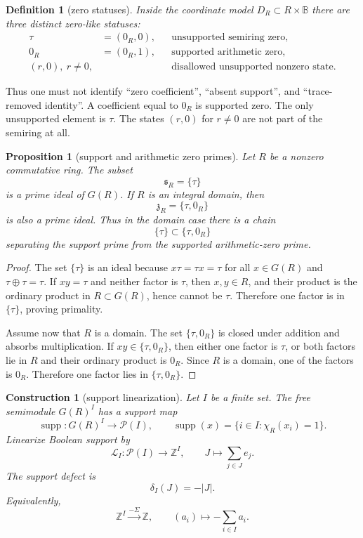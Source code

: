 \documentclass[11pt]{article}
\newtheorem{proposition}[theorem]{Proposition}
\newtheorem{definition}[theorem]{Definition}
\newtheorem{construction}[theorem]{Construction}
\theoremstyle{remark}
\DeclareMathOperator{\supp}{supp}
\newcommand{\ZZ}{\mathbb Z}
\newcommand{\BB}{\mathbb B}
\begin{document}
\begin{definition}[zero statuses]
Inside the coordinate model $D_R\subset R\times\BB$ there are three distinct zero-like statuses:
\begin{align*}
        \tau&=(0_R,0), &&\text{unsupported semiring zero},\\
        0_R&=(0_R,1), &&\text{supported arithmetic zero},\\
        (r,0),\ r\ne0, &&&\text{disallowed unsupported nonzero state}.
\end{align*}
\end{definition}

Thus one must not identify ``zero coefficient'', ``absent support'', and ``trace-removed identity''.  A coefficient equal to $0_R$ is supported zero.  The only unsupported element is $\tau$.  The states $(r,0)$ for $r\ne0$ are not part of the semiring at all.

\begin{proposition}[support and arithmetic zero primes]
Let $R$ be a nonzero commutative ring.  The subset
\[
        \mathfrak s_R=\{\tau\}
\]
is a prime ideal of $G(R)$.  If $R$ is an integral domain, then
\[
        \mathfrak z_R=\{\tau,0_R\}
\]
is also a prime ideal.  Thus in the domain case there is a chain
\[
        \{\tau\}\subset\{\tau,0_R\}
\]
separating the support prime from the supported arithmetic-zero prime.
\end{proposition}

\begin{proof}
The set $\{\tau\}$ is an ideal because $x\tau=\tau x=\tau$ for all $x\in G(R)$ and $\tau\oplus\tau=\tau$.  If $xy=\tau$ and neither factor is $\tau$, then $x,y\in R$, and their product is the ordinary product in $R\subset G(R)$, hence cannot be $\tau$.  Therefore one factor is in $\{\tau\}$, proving primality.

Assume now that $R$ is a domain.  The set $\{\tau,0_R\}$ is closed under addition and absorbs multiplication.  If $xy\in\{\tau,0_R\}$, then either one factor is $\tau$, or both factors lie in $R$ and their ordinary product is $0_R$.  Since $R$ is a domain, one of the factors is $0_R$.  Therefore one factor lies in $\{\tau,0_R\}$.\end{proof}

\begin{construction}[support linearization]
Let $I$ be a finite set.  The free semimodule $G(R)^I$ has a support map
\[
        \supp:G(R)^I\to\mathcal P(I),
        \qquad
        \supp(x)=\{i\in I: \chi_R(x_i)=1\}.
\]
Linearize Boolean support by
\[
        \mathcal L_I:\mathcal P(I)\to\ZZ^I,
        \qquad
        J\mapsto\sum_{j\in J}e_j.
\]
The support defect is
\[
        \delta_I(J)= -|J|.
\]
Equivalently,
\[
        \ZZ^I\xrightarrow{-\Sigma}\ZZ,
        \qquad
        (a_i)\mapsto-\sum_{i\in I}a_i.
\]
\end{construction}
\end{document}
